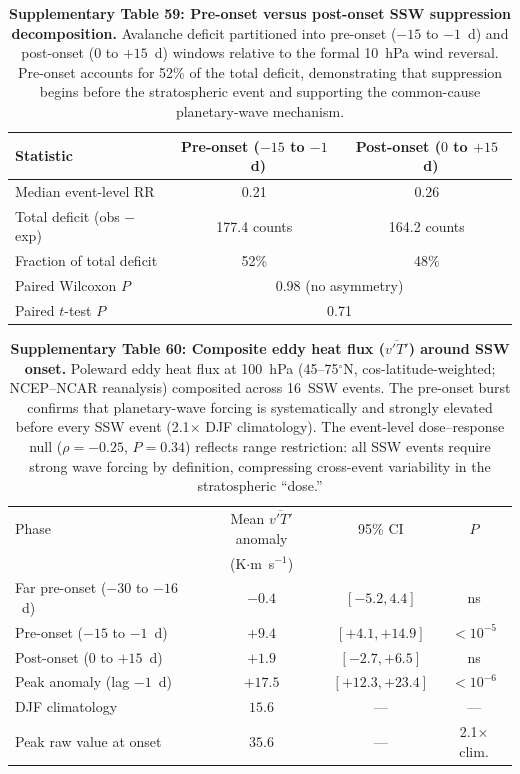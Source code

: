 \documentclass[11pt,letterpaper]{article}
\begin{document}

\begin{table}[!ht]
\centering
\caption{\textbf{Supplementary Table 59: Pre-onset versus post-onset SSW suppression decomposition.}
Avalanche deficit partitioned into pre-onset ($-15$ to $-1$~d) and post-onset ($0$ to $+15$~d) windows relative to the formal 10~hPa wind reversal. Pre-onset accounts for 52\% of the total deficit, demonstrating that suppression begins before the stratospheric event and supporting the common-cause planetary-wave mechanism.}
\label{tab:pre_post_decomp}
\small
\begin{tabular}{lcc}
\toprule
Statistic & Pre-onset ($-15$ to $-1$~d) & Post-onset ($0$ to $+15$~d) \\
\midrule
Median event-level RR & 0.21 & 0.26 \\
Total deficit (obs $-$ exp) & 177.4 counts & 164.2 counts \\
Fraction of total deficit & 52\% & 48\% \\
Paired Wilcoxon $P$ & \multicolumn{2}{c}{0.98 (no asymmetry)} \\
Paired $t$-test $P$ & \multicolumn{2}{c}{0.71} \\
\bottomrule
\end{tabular}
\end{table}

\begin{table}[!ht]
\centering
\caption{\textbf{Supplementary Table 60: Composite eddy heat flux ($\overline{v'T'}$) around SSW onset.}
Poleward eddy heat flux at 100~hPa (45--75$^\circ$N, cos-latitude-weighted; NCEP--NCAR reanalysis) composited across 16~SSW events. The pre-onset burst confirms that planetary-wave forcing is systematically and strongly elevated before every SSW event (2.1$\times$ DJF climatology). The event-level dose--response null ($\rho = -0.25$, $P = 0.34$) reflects range restriction: all SSW events require strong wave forcing by definition, compressing cross-event variability in the stratospheric ``dose.''}
\label{tab:vt_composite}
\small
\begin{tabular}{lccc}
\toprule
Phase & Mean $\overline{v'T'}$ anomaly & 95\% CI & $P$ \\
 & (K$\cdot$m~s$^{-1}$) & & \\
\midrule
Far pre-onset ($-30$ to $-16$~d) & $-0.4$ & $[-5.2, 4.4]$ & ns \\
Pre-onset ($-15$ to $-1$~d) & $+9.4$ & $[+4.1, +14.9]$ & $< 10^{-5}$ \\
Post-onset ($0$ to $+15$~d) & $+1.9$ & $[-2.7, +6.5]$ & ns \\
\midrule
Peak anomaly (lag $-1$~d) & $+17.5$ & $[+12.3, +23.4]$ & $< 10^{-6}$ \\
DJF climatology & $15.6$ & --- & --- \\
Peak raw value at onset & $35.6$ & --- & 2.1$\times$ clim. \\
\bottomrule
\end{tabular}
\end{table}
\end{document}
